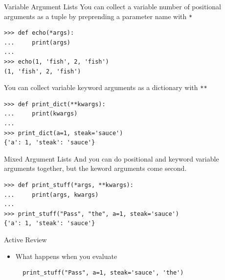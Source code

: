 \documentclass[smaller, aspectratio=1610]{beamer}
\begin{document}
\begin{frame}[label={sec:org32bee25},fragile]{Variable Argument Lists}
 You can collect a variable number of positional arguments as a tuple by preprending a parameter name with \texttt{*}

\lstset{language=Python,label= ,caption= ,captionpos=b,numbers=none}
\begin{lstlisting}
>>> def echo(*args):
...     print(args)
...
>>> echo(1, 'fish', 2, 'fish')
(1, 'fish', 2, 'fish')
\end{lstlisting}

You can collect variable keyword arguments as a dictionary with \texttt{**}

\lstset{language=Python,label= ,caption= ,captionpos=b,numbers=none}
\begin{lstlisting}
>>> def print_dict(**kwargs):
...     print(kwargs)
...
>>> print_dict(a=1, steak='sauce')
{'a': 1, 'steak': 'sauce'}
\end{lstlisting}
\end{frame}

\begin{frame}[label={sec:org5de3a13},fragile]{Mixed Argument Lists}
 And you can do positional and keyword variable arguments together, but the keword arguments come second.

\lstset{language=Python,label= ,caption= ,captionpos=b,numbers=none}
\begin{lstlisting}
>>> def print_stuff(*args, **kwargs):
...     print(args, kwargs)
...
>>> print_stuff("Pass", "the", a=1, steak='sauce')
{'a': 1, 'steak': 'sauce'}
\end{lstlisting}

\begin{block}{Active Review}
\begin{itemize}
\item What happens when you evaluate

\lstset{language=Python,label= ,caption= ,captionpos=b,numbers=none}
\begin{lstlisting}
  print_stuff("Pass", a=1, steak='sauce', 'the')
\end{lstlisting}
\end{itemize}
\end{block}
\end{frame}
\end{document}
